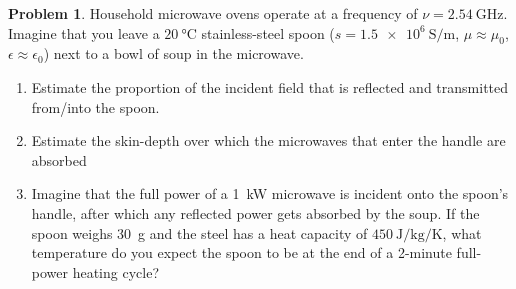 \documentclass[10pt]{article}
\theoremstyle{definition}
\newtheorem{problem}{Problem}
\begin{document}
\begin{problem}
Household microwave ovens operate at a frequency of
$\nu=\qty{2.54}{\giga\hertz}$. Imagine that
you leave a $\qty{20}{\degreeCelsius}$ stainless-steel spoon ($s=\qty{1.5e6}{\siemens\per\meter}$,
$\mu\approx\mu_0$, $\epsilon\approx\epsilon_0$) next to a
bowl of soup in the microwave.
\begin{enumerate}[label=(\alph*)]
  \item Estimate the proportion of the incident field that is reflected and
        transmitted from/into the spoon.
  \item Estimate the skin-depth over which the microwaves that enter the handle
        are absorbed
  \item Imagine that the full power of a \qty{1}{\kilo\watt} microwave is incident onto the
        spoon's handle, after which any reflected power gets absorbed by the soup.
        If the spoon weighs \qty{30}{\gram} and the steel has a heat capacity of $\qty{450}{\joule\per\kilo\gram\per\kelvin}$,
        what temperature do you expect the spoon to be at the end of a 2-minute
        full-power heating cycle?
\end{enumerate}
\end{problem}
\end{document}
